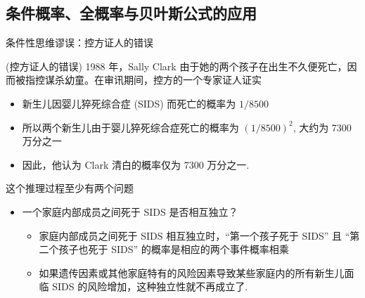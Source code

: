 \subsection{条件概率、全概率与贝叶斯公式的应用}
\begin{frame}{条件性思维谬误：控方证人的错误}
\begin{exam}{\tc (控方证人的错误)} 1988 年，Sally Clark 由于她的两个孩子在出生不久便死亡，因而被指控谋杀幼童。在审讯期间，控方的一个专家证人证实
\begin{itemize}[<+-|alert@+>]
\item 新生儿因婴儿猝死综合症 (SIDS) 而死亡的概率为 $1/8500$
\item 所以两个新生儿由于婴儿猝死综合症死亡的概率为 $(1/8500)^2$, 大约为 7300 万分之一
\item 因此，他认为 Clark 清白的概率仅为 7300 万分之一.
\end{itemize}
\end{exam}
\vspace{0.2cm}

\pause
\begin{jieda} 这个推理过程至少有两个问题
\begin{itemize}[<+-|alert@+>]
\item 一个家庭内部成员之间死于 SIDS 是否相互独立？
\begin{itemize}[<+-|alert@+>]
\item 家庭内部成员之间死于 SIDS 相互独立时，“第一个孩子死于 SIDS” 且 “第二个孩子也死于 SIDS” 的概率是相应的两个事件概率相乘
\item 如果遗传因素或其他家庭特有的风险因素导致某些家庭内的所有新生儿面临 SIDS 的风险增加，这种独立性就不再成立了.
\end{itemize}
\end{itemize}
\end{jieda}
\end{frame}

